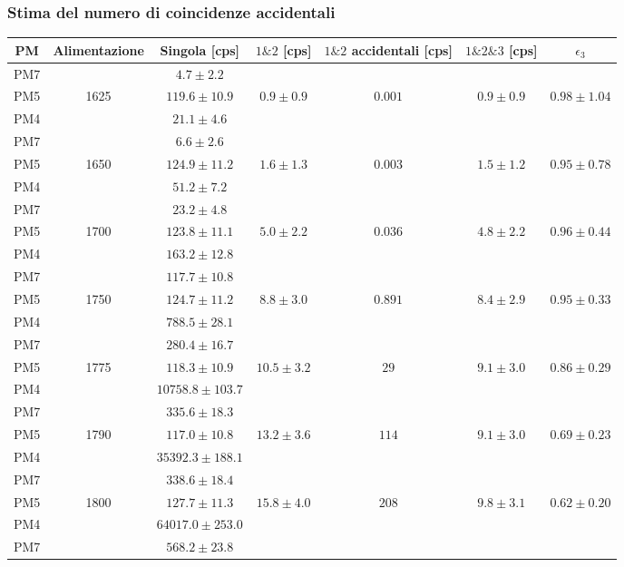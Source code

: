 \documentclass{article}
\begin{document}
\subsubsection{Stima del numero di coincidenze accidentali}
\begin{table}[H]
\centering
\begin{tabular}{|c|c|c|c|c|c|c|}
\hline
PM & Alimentazione & Singola [cps] & $1 \& 2$  [cps] & $1 \& 2$ accidentali [cps]&  $1\&2\& 3$ [cps]& $\epsilon_3$\\ 
\hline 
PM7 & & $4.7 \pm 2.2$ & & & & \\ 
PM5 & 1625 & $119.6 \pm 10.9$& $0.9 \pm 0.9$  & $0.001$ & $0.9 \pm 0.9$& $0.98 \pm 1.04$ \\ 
PM4 & & $21.1 \pm 4.6$ & & & & \\ 
\hline 
PM7 & & $6.6 \pm 2.6$ & & & & \\ 
PM5 & 1650 & $124.9 \pm 11.2$& $1.6 \pm 1.3$  & $0.003$ & $1.5 \pm 1.2$& $0.95 \pm 0.78$ \\ 
PM4 & & $51.2 \pm 7.2$ & & & & \\ 
\hline 
PM7 & & $23.2 \pm 4.8$ & & & & \\ 
PM5 & 1700 & $123.8 \pm 11.1$& $5.0 \pm 2.2$  & $0.036$ & $4.8 \pm 2.2$& $0.96 \pm 0.44$ \\ 
PM4 & & $163.2 \pm 12.8$ & & & & \\ 
\hline 
PM7 & & $117.7 \pm 10.8$ & & & & \\ 
PM5 & 1750 & $124.7 \pm 11.2$& $8.8 \pm 3.0$  & $0.891$ & $8.4 \pm 2.9$& $0.95 \pm 0.33$ \\ 
PM4 & & $788.5 \pm 28.1$ & & & & \\ 
\hline 
PM7 & & $280.4 \pm 16.7$ & & & & \\ 
PM5 & 1775 & $118.3 \pm 10.9$& $10.5 \pm 3.2$  & $29$ & $9.1 \pm 3.0$& $0.86 \pm 0.29$ \\ 
PM4 & & $10758.8 \pm 103.7$ & & & & \\ 
\hline 
PM7 & & $335.6 \pm 18.3$ & & & & \\ 
PM5 & 1790 & $117.0 \pm 10.8$& $13.2 \pm 3.6$  & $114$ & $9.1 \pm 3.0$& $0.69 \pm 0.23$ \\ 
PM4 & & $35392.3 \pm 188.1$ & & & & \\ 
\hline 
PM7 & & $338.6 \pm 18.4$ & & & & \\ 
PM5 & 1800 & $127.7 \pm 11.3$& $15.8 \pm 4.0$  & $208$ & $9.8 \pm 3.1$& $0.62 \pm 0.20$ \\ 
PM4 & & $64017.0 \pm 253.0$ & & & & \\ 
\hline 
PM7 & & $568.2 \pm 23.8$ & & & & \\ 

\end{tabular}
\end{table}
\end{document}
